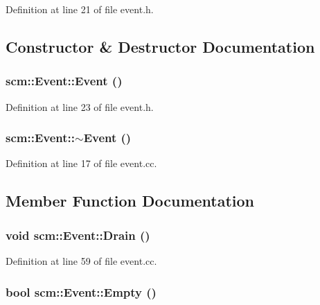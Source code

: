 Definition at line 21 of file event.h.



\subsection{Constructor \& Destructor Documentation}
\hypertarget{classscm_1_1_event_ae0b0fbe856c9fbce52b50e08860946e8}{
\subsubsection[{Event}]{\setlength{\rightskip}{0pt plus 5cm}scm::Event::Event ()}}
\label{classscm_1_1_event_ae0b0fbe856c9fbce52b50e08860946e8}


Definition at line 23 of file event.h.

\hypertarget{classscm_1_1_event_a4f22bf217daf2b5e3670e987579fb152}{
\subsubsection[{$\sim$Event}]{\setlength{\rightskip}{0pt plus 5cm}scm::Event::$\sim$Event ()}}
\label{classscm_1_1_event_a4f22bf217daf2b5e3670e987579fb152}


Definition at line 17 of file event.cc.



\subsection{Member Function Documentation}
\hypertarget{classscm_1_1_event_aba1e9492e1d03bd67afb9c8943e89fe9}{
\subsubsection[{Drain}]{\setlength{\rightskip}{0pt plus 5cm}void scm::Event::Drain ()}}
\label{classscm_1_1_event_aba1e9492e1d03bd67afb9c8943e89fe9}


Definition at line 59 of file event.cc.

\hypertarget{classscm_1_1_event_ae736ee83efd335726cad841b6082e491}{
\subsubsection[{Empty}]{\setlength{\rightskip}{0pt plus 5cm}bool scm::Event::Empty ()}}
\label{classscm_1_1_event_ae736ee83efd335726cad841b6082e491}


